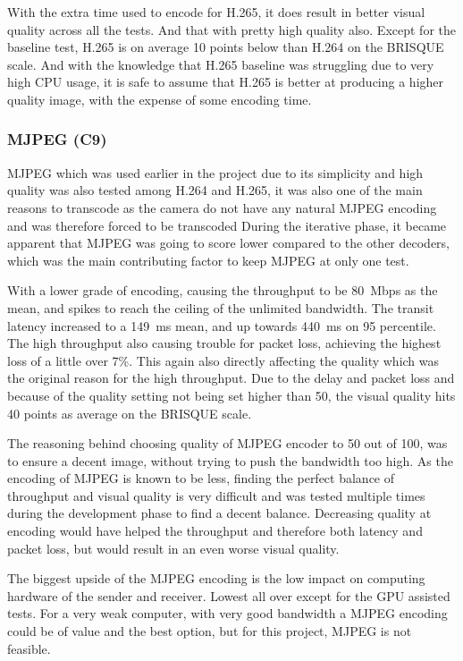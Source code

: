 With the extra time used to encode for H.265, it does result in better visual quality across all the tests. And that with pretty high quality also. Except for the baseline test, H.265 is on average 10 points below than H.264 on the BRISQUE scale. And with the knowledge that H.265 baseline was struggling due to very high CPU usage, it is safe to assume that H.265 is better at producing a higher quality image, with the expense of some encoding time.

\subsubsection{MJPEG (C9)}\label{subsubsec:mjpegDiscussion}

MJPEG which was used earlier in the project due to its simplicity and high quality was also tested among H.264 and H.265, it was also one of the main reasons to transcode as the camera do not have any natural MJPEG encoding and was therefore forced to be transcoded During the iterative phase, it became apparent that MJPEG was going to score lower compared to the other decoders, which was the main contributing factor to keep MJPEG at only one test.

With a lower grade of encoding, causing the throughput to be 80~Mbps as the mean, and spikes to reach the ceiling of the unlimited bandwidth. The transit latency increased to a 149~ms mean, and up towards 440~ms on 95 percentile. The high throughput also causing trouble for packet loss, achieving the highest loss of a little over 7\%. This again also directly affecting the quality which was the original reason for the high throughput. Due to the delay and packet loss and because of the quality setting not being set higher than 50, the visual quality hits 40 points as average on the BRISQUE scale. 

The reasoning behind choosing quality of MJPEG encoder to 50 out of 100, was to ensure a decent image, without trying to push the bandwidth too high. As the encoding of MJPEG is known to be less, finding the perfect balance of throughput and visual quality is very difficult and was tested multiple times during the development phase to find a decent balance. Decreasing quality at encoding would have helped the throughput and therefore both latency and packet loss, but would result in an even worse visual quality. 

The biggest upside of the MJPEG encoding is the low impact on computing hardware of the sender and receiver. Lowest all over except for the GPU assisted tests. For a very weak computer, with very good bandwidth a MJPEG encoding could be of value and the best option, but for this project, MJPEG is not feasible.

